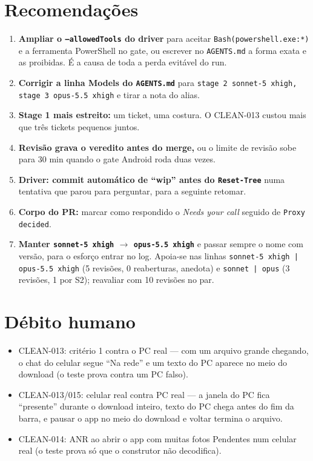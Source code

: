 \documentclass[11pt,a4paper]{article}
\begin{document}
\section{Recomendações}
\begin{enumerate}
  \item \textbf{Ampliar o \texttt{--allowedTools} do driver} para aceitar
        \texttt{Bash(powershell.exe:*)} e a ferramenta PowerShell no gate, ou
        escrever no \texttt{AGENTS.md} a forma exata e as proibidas. É a causa
        de toda a perda evitável do run.
  \item \textbf{Corrigir a linha Models do \texttt{AGENTS.md}} para
        \texttt{stage 2 sonnet-5 xhigh, stage 3 opus-5.5 xhigh} e tirar a nota
        do alias.
  \item \textbf{Stage 1 mais estreito:} um ticket, uma costura. O CLEAN-013
        custou mais que três tickets pequenos juntos.
  \item \textbf{Revisão grava o veredito antes do merge,} ou o limite de
        revisão sobe para 30 min quando o gate Android roda duas vezes.
  \item \textbf{Driver: commit automático de ``wip'' antes do
        \texttt{Reset-Tree}} numa tentativa que parou para perguntar, para a
        seguinte retomar.
  \item \textbf{Corpo do PR:} marcar como respondido o \emph{Needs your call}
        seguido de \texttt{Proxy decided}.
  \item \textbf{Manter \texttt{sonnet-5 xhigh} $\to$ \texttt{opus-5.5 xhigh}}
        e passar sempre o nome com versão, para o esforço entrar no log.
        Apoia-se nas linhas \texttt{sonnet-5 xhigh | opus-5.5 xhigh} (5
        revisões, 0 reaberturas, anedota) e \texttt{sonnet | opus} (3
        revisões, 1 por S2); reavaliar com 10 revisões no par.
\end{enumerate}

\section{Débito humano}
\begin{itemize}
  \item CLEAN-013: critério 1 contra o PC real --- com um arquivo grande
        chegando, o chat do celular segue ``Na rede'' e um texto do PC aparece
        no meio do download (o teste prova contra um PC falso).
  \item CLEAN-013/015: celular real contra PC real --- a janela do PC fica
        ``presente'' durante o download inteiro, texto do PC chega antes do fim
        da barra, e pausar o app no meio do download e voltar termina o
        arquivo.
  \item CLEAN-014: ANR ao abrir o app com muitas fotos Pendentes num celular
        real (o teste prova só que o construtor não decodifica).
\end{itemize}
\end{document}
